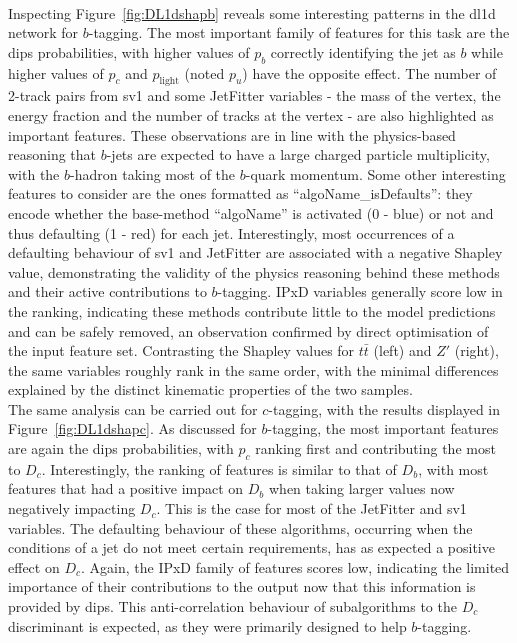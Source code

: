 \paragraph{}Inspecting Figure~\ref{fig:DL1dshapb} reveals some interesting patterns in the \gls{dl1d} network for $b$-tagging. The most important family of features for this task are the \gls{dips} probabilities, with higher values of $p_b$ correctly identifying the jet as $b$ while higher values of $p_c$ and $p_{\textrm{light}}$ (noted $p_u$) have the opposite effect. The number of 2-track pairs from \gls{sv1} and some JetFitter variables - the mass of the vertex, the energy fraction and the number of tracks at the vertex - are also highlighted as important features. These observations are in line with the physics-based reasoning that $b$-jets are expected to have a large charged particle multiplicity, with the $b$-hadron taking most of the $b$-quark momentum. Some other interesting features to consider are the ones formatted as  ``algoName\_isDefaults'': they encode whether the base-method ``algoName'' is activated (0 - blue) or not and thus defaulting (1 - red) for each jet. Interestingly, most occurrences of a defaulting behaviour of \gls{sv1} and JetFitter are associated with a negative Shapley value, demonstrating the validity of the physics reasoning behind these methods and their active contributions to $b$-tagging. IPxD variables generally score low in the ranking, indicating these methods contribute little to the model predictions and can be safely removed, an observation confirmed by direct optimisation of the input feature set. Contrasting the Shapley values for $t\bar{t}$ (left) and $Z'$ (right), the same variables roughly rank in the same order, with the minimal differences explained by the distinct kinematic properties of the two samples. \\

The same analysis can be carried out for $c$-tagging, with the results displayed in Figure~\ref{fig:DL1dshapc}. As discussed for $b$-tagging, the most important features are again the \gls{dips} probabilities, with $p_c$ ranking first and contributing the most to $D_c$. Interestingly, the ranking of features is similar to that of $D_b$, with most features that had a positive impact on $D_b$ when taking larger values now negatively impacting $D_c$. This is the case for most of the JetFitter and \gls{sv1} variables. The defaulting behaviour of these algorithms, occurring when the conditions of a jet do not meet certain requirements, has as expected a positive effect on $D_c$. Again, the IPxD family of features scores low, indicating the limited importance of their contributions to the output now that this information is provided by \gls{dips}. This anti-correlation behaviour of subalgorithms to the $D_c$ discriminant is expected, as they were primarily designed to help $b$-tagging. 

